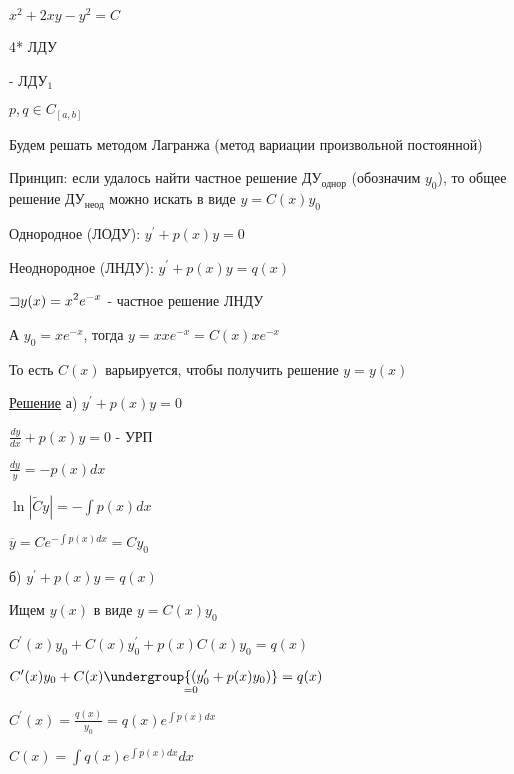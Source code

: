 \documentclass[12pt]{article}
\begin{document}
    $\displaystyle x^2 + 2xy - y^2 = C$

    4* ЛДУ

    \Def {} - ЛДУ$\displaystyle _1$

    $\displaystyle p, q \in C_{[a, b]}$

    \Nota Будем решать методом Лагранжа (метод вариации произвольной постоянной)

    Принцип: если удалось найти частное решение ДУ$\displaystyle _\text{однор}$ (обозначим $\displaystyle y_0$), то общее решение ДУ$\displaystyle _\text{неод}$
    можно искать в виде $\displaystyle y = C(x)y_0$

    \Def Однородное (ЛОДУ): $\displaystyle y^\prime + p(x)y = 0$

    \Def Неоднородное (ЛНДУ): $\displaystyle y^\prime + p(x)y = q(x)$

    \Ex $\displaystyle \mathord{\sqsupset} y(x) = x^2 e^{-x}$ - частное решение ЛНДУ

    А $\displaystyle y_0 = x e^{-x}$, тогда $\displaystyle y = x xe^{-x} = C(x) x e^{-x}$

    То есть $C(x)$ варьируется, чтобы получить решение $y = y(x)$

    \underline{Решение} а) $\displaystyle y^\prime + p(x)y = 0$

    $\displaystyle \frac{dy}{dx} + p(x)y = 0$ - УРП

    $\displaystyle \frac{dy}{y} = -p(x)dx$

    $\displaystyle \ln|\tilde{C}y| = -\int p(x)dx$

    $\displaystyle \overline{y} = Ce^{-\int p(x) dx} = Cy_0$

    б) $\displaystyle y^\prime + p(x)y = q(x)$

    Ищем $y(x)$ в виде $\displaystyle y = C(x)y_0$

    $\displaystyle C^\prime(x)y_0 + C(x)y^\prime_0 + p(x)C(x)y_0 = q(x)$

    $\displaystyle C^\prime(x)y_0 + C(x)\underset{=0}{\undergroup{(y^\prime_0 + p(x)y_0)}} = q(x)$

    $\displaystyle C^\prime(x) = \frac{q(x)}{y_0} = q(x)e^{\int p(x)dx}$

    $\displaystyle C(x) = \int q(x) e^{\int p(x)dx} dx$
\end{document}

